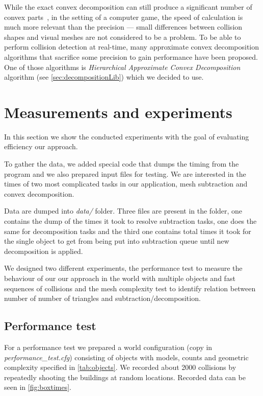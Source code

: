 While the exact convex decomposition can still produce a significant number of convex parts~\cite{convexDecomp}, in the setting of a computer game, the speed of calculation is much more relevant than the precision --- small differences between collision shapes and visual meshes are not considered to be a problem. To be able to perform collision detection at real-time, many approximate convex decomposition algorithms that sacrifice some precision to gain performance have been proposed. One of those algorithms is \emph{Hierarchical Approximate Convex Decomposition} algorithm (see \cref{sec:decompositionLib}) which we decided to use.

\section{Measurements and experiments}
\label{sec:testing}
In this section we show the conducted experiments with the goal of evaluating efficiency our approach. 

To gather the data, we added special code that dumps the timing from the program and we also prepared input files for testing. We are interested in the times of two most complicated tasks in our application, mesh subtraction and convex decomposition. 

Data are dumped into \emph{data/} folder. Three files are present in the folder, one contains the dump of the times it took to resolve subtraction tasks, one does the same for decomposition tasks and the third one contains total times it took for the single object to get from being put into subtraction queue until new decomposition is applied.

We designed two different experiments, the performance test to measure the behaviour of our our approach in the world with multiple objects and fast sequences of collisions and the mesh complexity test to identify relation between number of number of triangles and subtraction/decomposition.

\subsection{Performance test}
For a performance test we prepared a world configuration (copy in \emph{performance\_test.cfg}) consisting of objects with models, counts and geometric complexity specified in \cref{tab:objects}.
We recorded about 2000 collisions by repeatedly shooting the buildings at random locations. Recorded data can be seen in \cref{fig:boxtimes}.

